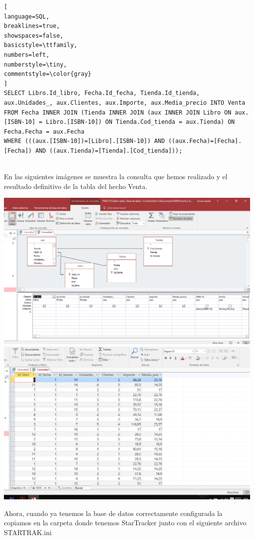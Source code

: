 \documentclass[paper=a4, fontsize=11pt, spanish]{scrartcl}
\numberwithin{equation}{section} %
\numberwithin{figure}{section} %
\numberwithin{table}{section} %
\begin{document}
\begin{lstlisting}[
language=SQL,
breaklines=true,
showspaces=false,
basicstyle=\ttfamily,
numbers=left,
numberstyle=\tiny,
commentstyle=\color{gray}
]
SELECT Libro.Id_libro, Fecha.Id_fecha, Tienda.Id_tienda, aux.Unidades_, aux.Clientes, aux.Importe, aux.Media_precio INTO Venta
FROM Fecha INNER JOIN (Tienda INNER JOIN (aux INNER JOIN Libro ON aux.[ISBN-10] = Libro.[ISBN-10]) ON Tienda.Cod_tienda = aux.Tienda) ON Fecha.Fecha = aux.Fecha
WHERE (((aux.[ISBN-10])=[Libro].[ISBN-10]) AND ((aux.Fecha)=[Fecha].[Fecha]) AND ((aux.Tienda)=[Tienda].[Cod_tienda]));


\end{lstlisting}
En las siguientes imágenes se muestra la consulta que hemos realizado y el resultado definitivo de la tabla del hecho Venta.
\begin{center}
	\includegraphics[scale=0.35]{id1.png}
	\includegraphics[scale=0.35]{id2.png}
\end{center}

Ahora, cuando ya tenemos la base de datos correctamente configurada la copiamos en la carpeta donde tenemos StarTracker junto con el siguiente archivo STARTRAK.ini
\end{document}
